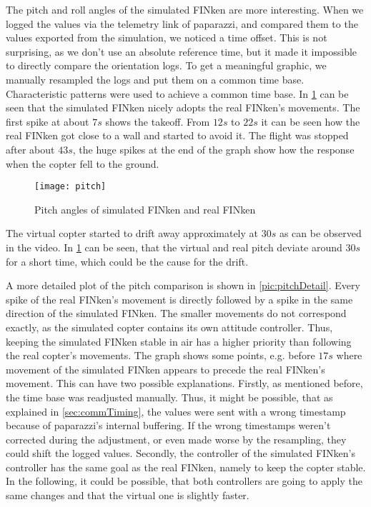 The pitch and roll angles of the simulated FINken are more interesting.
When we logged the values via the telemetry link of paparazzi, and compared them to the values exported from the simulation, we noticed a time offset. 
This is not surprising, as we don't use an absolute reference time, but it made it impossible to directly compare the orientation logs.
To get a meaningful graphic, we manually resampled the logs and put them on a common time base.
Characteristic patterns were used to achieve a common time base.
In \ref{pic:pitchResponse} can be seen that the simulated FINken nicely adopts the real FINken's movements. 
The first spike at about $7s$ shows the takeoff. 
From $12s$ to $22s$ it can be seen how the real FINken got close to a wall and started to avoid it. 
The flight was stopped after about $43s$, the huge spikes at the end of the graph show how the response when the copter fell to the ground.
\begin{figure}
	\begin{center}
	\texttt{[image: pitch]}
	\caption{Pitch angles of simulated FINken and real FINken}
	\label{pic:pitchResponse}
	\end{center}
\end{figure}

The virtual copter started to drift away approximately at $30s$ as can be observed in the video.
In \ref{pic:pitchResponse} can be seen, that the virtual and real pitch deviate around $30s$ for a short time, which could be the cause for the drift.

A more detailed plot of the pitch comparison is shown in \ref{pic:pitchDetail}.
Every spike of the real FINken's movement is directly followed by a spike in the same direction of the simulated FINken.
The smaller movements do not correspond exactly, as the simulated copter contains its own attitude controller.
Thus, keeping the simulated FINken stable in air has a higher priority than following the real copter's movements.
The graph shows some points, e.g. before $17s$ where movement of the simulated FINken appears to precede the real FINken's movement.
This can have two possible explanations.
Firstly, as mentioned before, the time base was readjusted manually.
Thus, it might be possible, that as explained in \ref{sec:commTiming}, the values were sent with a wrong timestamp because of paparazzi's internal buffering.
If the wrong timestamps weren't corrected during the adjustment, or even made worse by the resampling, they could shift the logged values.
Secondly,  the controller of the simulated FINken's controller has the same goal as the real FINken, namely to keep the copter stable. 
In the following, it could be possible, that both controllers are going to apply the same changes and that the virtual one is slightly faster.
 

